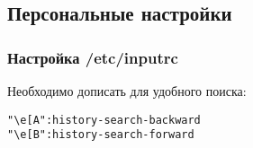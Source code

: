 \documentclass[10pt, a4paper]{article}
\begin{document}

\subsection{Персональные настройки}

\subsubsection{Настройка /etc/inputrc}

Необходимо дописать для удобного поиска:

\begin{verbatim}
"\e[A":history-search-backward
"\e[B":history-search-forward
\end{verbatim}
\end{document}
